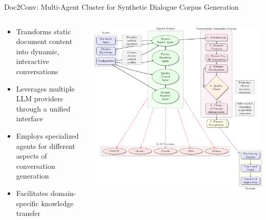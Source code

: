 \begin{frame}{Doc2Conv: Multi-Agent Cluster for Synthetic Dialogue Corpus Generation}
  \begin{columns}[T]
    \begin{column}{0.45\textwidth}
      \begin{itemize}
        \item Transforms static document content into dynamic, interactive conversations
        \item Leverages multiple LLM providers through a unified interface
        \item Employs specialized agents for different aspects of conversation generation
        \item Facilitates domain-specific knowledge transfer
      \end{itemize}
    \end{column}
    
    \begin{column}{0.55\textwidth}
      \includegraphics[width=\textwidth, height=0.62\paperheight]{presentation/images/Pictures/doc2conv_architecture.pdf}
    \end{column}
  \end{columns}
\end{frame}

